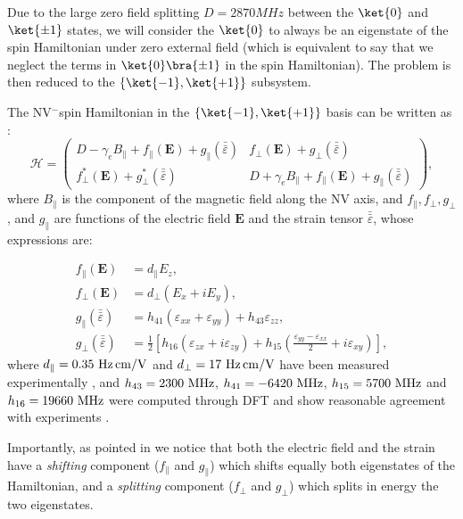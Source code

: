 \documentclass[a4paper,11pt]{report}
\begin{document}
Due to the large zero field splitting $D=2870 MHz$ between the $\ket{0}$ and $\ket{\pm 1}$ states, we will consider the $\ket{0}$ to always be an eigenstate of the spin Hamiltonian under zero external field (which is equivalent to say that we neglect the terms in $\ket{0}\bra{\pm 1}$ in the spin Hamiltonian). The problem is then reduced to the $\{ \ket{-1}, \ket{+1} \}$ subsystem.

The NV$^-$spin Hamiltonian in the $\{ \ket{-1}, \ket{+1} \}$ basis can be written as \citep{udvarhelyi2018spin}:
\begin{equation}
\mathcal{H}=\begin{pmatrix}
D-\gamma_e B_\parallel + f_\parallel(\mathbf{E}) + g_\parallel(\bar{\bar{\varepsilon}}) & f_\perp(\mathbf{E}) + g_\perp(\bar{\bar{\varepsilon}})\\
f^*_\perp(\mathbf{E}) + g^*_\perp(\bar{\bar{\varepsilon}})&D+\gamma_e B_\parallel + f_\parallel(\mathbf{E}) + g_\parallel(\bar{\bar{\varepsilon}})
\end{pmatrix},
\label{Hamiltonien pm1}
\end{equation}
where $B_\parallel$ is the component of the magnetic field along the NV axis, and $f_\parallel, f_\perp, g_\perp$, and $g_\parallel$ are functions of the electric field $\mathbf{E}$ and the strain tensor $\bar{\bar{\varepsilon}}$, whose expressions are:

\begin{align}
f_\parallel(\mathbf{E})&=d_\parallel E_z, \\
f_\perp(\mathbf{E})&=d_\perp ( E_x + i E_y), \\
g_\parallel(\bar{\bar{\varepsilon}})&= h_{41}(\varepsilon_{xx}+\varepsilon_{yy})+h_{43} \varepsilon_{zz}, \\
g_\perp(\bar{\bar{\varepsilon}}) &= \frac{1}{2} \left[ h_{16}(\varepsilon_{zx}+i \varepsilon_{zy}) + h_{15}\left(\frac{\varepsilon_{yy}-\varepsilon_{xx}}{2}+i\varepsilon_{xy}\right) \right],
\end{align}
where $d_\parallel=0.35 \ \rm{Hz\, cm/V}$ and $d_\perp=17\ \rm{Hz\, cm/V}$ have been measured experimentally \citep{van1990electric}, and $h_{43}=2300\ \rm{MHz}$, $h_{41}=-6420\ \rm{MHz}$, $h_{15}=5700\ \rm{MHz}$ and $h_{16}=19660\ \rm{MHz}$ were computed through DFT \citep{udvarhelyi2018spin} and show reasonable agreement with experiments \citep{barson2017nanomechanical}.

Importantly, as pointed in \citep{mittiga2018imaging} we notice that both the electric field and the strain have a \textit{shifting} component ($f_\parallel$ and $g_\parallel$) which shifts equally both eigenstates of the Hamiltonian, and a \textit{splitting} component ($f_\perp$ and $g_\perp$) which splits in energy the two eigenstates. 
\end{document}
